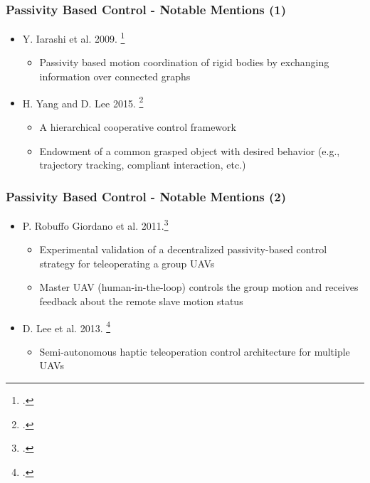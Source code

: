 \begin{frame}
	\frametitle{Passivity Based Control - Notable Mentions (1)}
	\begin{itemize}
		\item Y. Iarashi et al. 2009. \footcite{passivity-attitude-sync} 
		\begin{itemize}
			\item Passivity based motion coordination of rigid bodies by exchanging information over connected graphs
		\end{itemize} 
		\item H. Yang and D. Lee 2015. \footcite{cooperative-control-quadrotor}
		\begin{itemize}
			\item A hierarchical cooperative control framework
			\item Endowment of a common grasped object with desired behavior (e.g., trajectory tracking, compliant interaction, etc.)
		\end{itemize}
	\end{itemize}
\end{frame}

\begin{frame}
	\frametitle{Passivity Based Control - Notable Mentions (2)}
	\begin{itemize}
		\item P. Robuffo Giordano et al. 2011.\footcite{group-teleoperation} 
		\begin{itemize}
			\item Experimental validation of a decentralized passivity-based control strategy for teleoperating a group UAVs
			\item Master UAV (human-in-the-loop) controls the group motion and receives feedback about the remote slave motion status
		\end{itemize}
		\item D. Lee et al. 2013. \footcite{haptic-teleoperation-uav}
		\begin{itemize}
			\item Semi-autonomous haptic teleoperation control architecture for multiple UAVs
		\end{itemize}
	\end{itemize}
\end{frame}